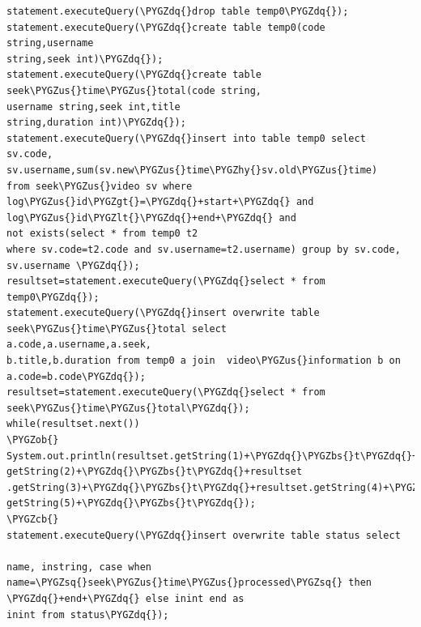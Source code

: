 \documentclass[a4paper,12pt,oneside]{sphinxmanual}
\def\PYGZbs{\char`\\}
\def\PYGZus{\char`\_}
\def\PYGZob{\char`\{}
\def\PYGZcb{\char`\}}
\def\PYGZlt{\char`\<}
\def\PYGZgt{\char`\>}
\def\PYGZhy{\char`\-}
\def\PYGZsq{\char`\'}
\def\PYGZdq{\char`\"}
\begin{document}
\begin{Verbatim}[commandchars=\\\{\}]
statement.executeQuery(\PYGZdq{}drop table temp0\PYGZdq{});
statement.executeQuery(\PYGZdq{}create table temp0(code string,username
string,seek int)\PYGZdq{});
statement.executeQuery(\PYGZdq{}create table seek\PYGZus{}time\PYGZus{}total(code string,
username string,seek int,title
string,duration int)\PYGZdq{});
statement.executeQuery(\PYGZdq{}insert into table temp0 select sv.code,
sv.username,sum(sv.new\PYGZus{}time\PYGZhy{}sv.old\PYGZus{}time)
from seek\PYGZus{}video sv where log\PYGZus{}id\PYGZgt{}=\PYGZdq{}+start+\PYGZdq{} and log\PYGZus{}id\PYGZlt{}\PYGZdq{}+end+\PYGZdq{} and
not exists(select * from temp0 t2
where sv.code=t2.code and sv.username=t2.username) group by sv.code,
sv.username \PYGZdq{});
resultset=statement.executeQuery(\PYGZdq{}select * from temp0\PYGZdq{});
statement.executeQuery(\PYGZdq{}insert overwrite table seek\PYGZus{}time\PYGZus{}total select
a.code,a.username,a.seek,
b.title,b.duration from temp0 a join  video\PYGZus{}information b on
a.code=b.code\PYGZdq{});
resultset=statement.executeQuery(\PYGZdq{}select * from seek\PYGZus{}time\PYGZus{}total\PYGZdq{});
while(resultset.next())
\PYGZob{}
System.out.println(resultset.getString(1)+\PYGZdq{}\PYGZbs{}t\PYGZdq{}+resultset.
getString(2)+\PYGZdq{}\PYGZbs{}t\PYGZdq{}+resultset
.getString(3)+\PYGZdq{}\PYGZbs{}t\PYGZdq{}+resultset.getString(4)+\PYGZdq{}\PYGZbs{}t\PYGZdq{}+resultset.
getString(5)+\PYGZdq{}\PYGZbs{}t\PYGZdq{});
\PYGZcb{}
statement.executeQuery(\PYGZdq{}insert overwrite table status select

name, instring, case when
name=\PYGZsq{}seek\PYGZus{}time\PYGZus{}processed\PYGZsq{} then \PYGZdq{}+end+\PYGZdq{} else inint end as
inint from status\PYGZdq{});
\end{Verbatim}
\end{document}
